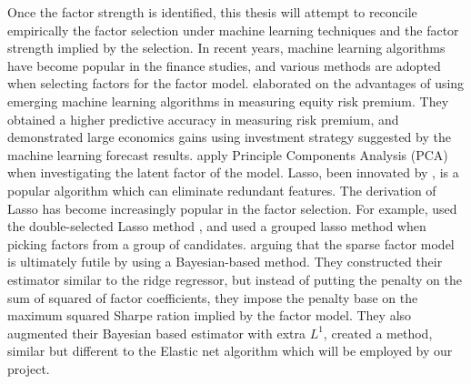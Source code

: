 Once the factor strength is identified, this thesis will attempt to reconcile empirically the factor selection under machine learning techniques and the factor strength implied by the selection.
In recent years, machine learning algorithms have become popular in the finance studies, and various methods are adopted when selecting factors for the factor model.
 elaborated on the advantages of using emerging machine learning algorithms in measuring equity risk premium.
They obtained a higher predictive accuracy in measuring risk premium, and demonstrated large economics gains using investment strategy suggested by the machine learning forecast results.
 apply Principle Components Analysis (PCA) when investigating the latent factor of the model. 
Lasso, been innovated by , is a popular algorithm which can eliminate redundant features. 
The derivation of Lasso has become increasingly popular in the factor selection.
For example,  used the double-selected Lasso method \cite{Belloni2014}, and  used a grouped lasso method \cite{Huang2010} when picking factors from a group of candidates. 
 arguing that the sparse factor model is ultimately futile by using a Bayesian-based method. 
They constructed their estimator similar to the ridge regressor, but instead of putting the penalty on the sum of squared of factor coefficients, they impose the penalty base on the maximum squared Sharpe ration implied by the factor model.
They also augmented their Bayesian based estimator with extra $L^1$, created a method,  similar but different to the Elastic net algorithm which will be employed by our project. 
